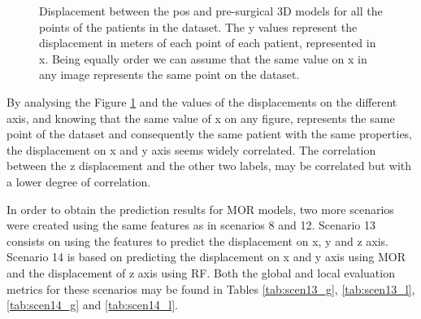 \begin{figure}[!htb]
\centering
{}
\caption[Displacement between the pos and pre-surgical 3D models for all the points of the patients in the dataset]{Displacement between the pos and pre-surgical 3D models for all the points of the patients in the dataset. The y values represent the displacement in meters of each point of each patient, represented in x. Being equally order we can assume that the same value on x in any image represents the same point on the dataset.}
\label{fig:labels_corr}
\end{figure}

By analysing the Figure \ref{fig:labels_corr} and the values of the displacements on the different axis, and knowing that the same value of x on any figure, represents the same point of the dataset and consequently the same patient with the same properties, the displacement on x and y axis seems widely correlated. The correlation between the z displacement and the other two labels, may be correlated but with a lower degree of correlation.

In order to obtain the prediction results for MOR models, two more scenarios were created using the same features as in scenarios 8 and 12. Scenario 13 consists on using the features to predict the displacement on x, y and z axis. Scenario 14 is based on predicting the displacement on x and y axis using MOR and the displacement of z axis using RF. Both the global and local evaluation metrics for these scenarios may be found in Tables \ref{tab:scen13_g}, \ref{tab:scen13_l}, \ref{tab:scen14_g} and \ref{tab:scen14_l}.

